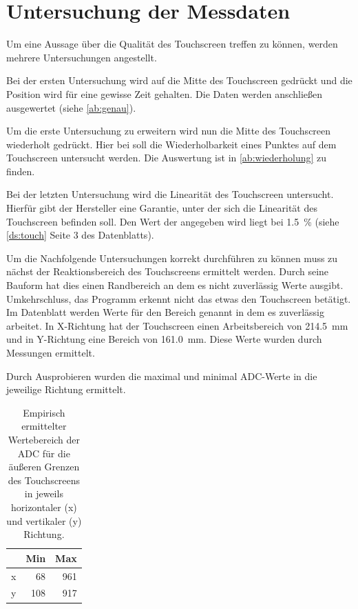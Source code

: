 \chapter{Untersuchung der Messdaten}
Um eine Aussage über die Qualität des Touchscreen treffen zu können, werden mehrere Untersuchungen angestellt.

Bei der ersten Untersuchung wird auf die Mitte des Touchscreen gedrückt und die Position wird für eine gewisse Zeit gehalten.
Die Daten werden anschließen ausgewertet (siehe \cref{ab:genau}).

Um die erste Untersuchung zu erweitern wird nun die Mitte des Touchscreen wiederholt gedrückt.
Hier bei soll die Wiederholbarkeit eines Punktes auf dem Touchscreen untersucht werden.
Die Auswertung ist in \cref{ab:wiederholung} zu finden.

Bei der letzten Untersuchung wird die Linearität des Touchscreen untersucht.
Hierfür gibt der Hersteller eine Garantie, unter der sich die Linearität des Touchscreen befinden soll.
Den Wert der angegeben wird liegt bei \SI{1,5}{\%} (siehe \cref{ds:touch} Seite 3 des Datenblatts).

Um die Nachfolgende Untersuchungen korrekt durchführen zu können muss zu nächst der Reaktionsbereich des Touchscreens ermittelt werden.
Durch seine Bauform hat dies einen Randbereich an dem es nicht zuverlässig Werte ausgibt.
Umkehrschluss, das Programm erkennt nicht das etwas den Touchscreen betätigt.
Im Datenblatt werden Werte für den Bereich genannt in dem es zuverlässig arbeitet.
In X-Richtung hat der Touchscreen einen Arbeitsbereich von \SI{214,5}{mm} und in Y-Richtung eine Bereich von \SI{161,0}{mm}.
Diese Werte wurden durch Messungen ermittelt.

Durch Ausprobieren wurden die maximal und minimal ADC-Werte in die jeweilige Richtung ermittelt.


\begin{table}[h]
    \centering
    \caption[Empirisch ermittelter Wertebereich der ADC]{Empirisch ermittelter Wertebereich der ADC für die äußeren Grenzen des Touchscreens in jeweils horizontaler (x) und vertikaler (y) Richtung.}
    \begin{tabular}{@{}lrr@{}}
        \toprule
            &Min    &Max\\
        \midrule
        x   &68     &961\\
        y   &108    &917\\
        \bottomrule
    \end{tabular}
    \label{tab:ADC min max}
\end{table}

